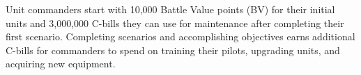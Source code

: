 Unit commanders start with 10,000 Battle Value points (BV) for their initial units and 3,000,000 C-bills they can use for maintenance after completing their first scenario.
Completing scenarios and accomplishing objectives earns additional C-bills for commanders to spend on training their pilots, upgrading units, and acquiring new equipment.
